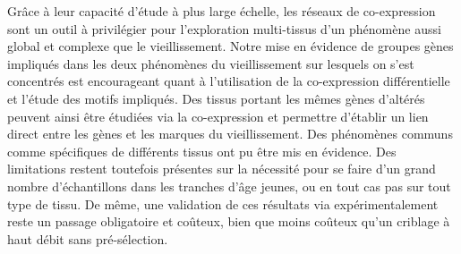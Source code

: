 Grâce à leur capacité d'étude à plus large échelle, les réseaux de co-expression sont un outil à privilégier pour l'exploration multi-tissus d'un phénomène aussi global et complexe que le vieillissement. Notre mise en évidence de groupes gènes impliqués dans les deux phénomènes du vieillissement sur lesquels on s'est concentrés est encourageant quant à l'utilisation de la co-expression différentielle et l'étude des motifs impliqués. Des tissus portant les mêmes gènes d'altérés peuvent ainsi être étudiées via la co-expression et permettre d'établir un lien direct entre les gènes et les marques du vieillissement. Des phénomènes communs comme spécifiques de différents tissus ont pu être mis en évidence. Des limitations restent toutefois présentes sur la nécessité pour se faire d'un grand nombre d'échantillons dans les tranches d'âge jeunes, ou en tout cas pas sur tout type de tissu. De même, une validation de ces résultats via expérimentalement reste un passage obligatoire et coûteux, bien que moins coûteux qu'un criblage à haut débit sans pré-sélection.






